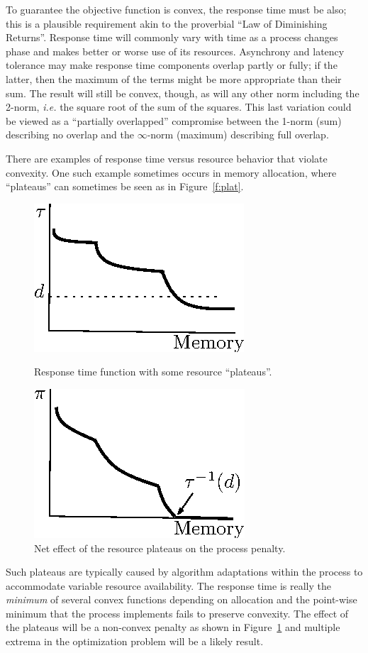 To guarantee the objective function is convex, the response time must be also;
this is a plausible requirement akin to the proverbial ``Law of Diminishing Returns''.
Response time will commonly vary with time as a process changes phase and makes better or worse use of its resources.
Asynchrony and latency tolerance may make response time components overlap partly or fully;
if the latter, then the maximum of the terms might be more appropriate than their sum.
The result will still be convex, though, as will any other norm including the 2-norm,
\emph{i.e.} the square root of the sum of the squares.
This last variation could be viewed as a ``partially overlapped'' compromise between
the 1-norm (sum) describing no overlap and the $\infty$-norm (maximum) describing full overlap.

There are examples of response time versus resource behavior that violate convexity.  One such example sometimes occurs in memory allocation, where ``plateaus'' can sometimes be seen as in Figure~\ref{f:plat}.
\begin{figure}[b]
\parbox{1.6in}{
\includegraphics*{Plateau1.eps}
\caption{\label{f:plat}Response time function with some resource ``plateaus''.}
}
\hspace{\fill}
\parbox{1.6in}{
\includegraphics*{Plateau2.eps}
\caption{\label{f:plateffect}Net effect of the resource plateaus on the process penalty.}
}
\end{figure}
Such plateaus are typically caused by algorithm adaptations within the process to accommodate variable resource availability.  The response time is really the \emph{minimum} of several convex functions depending on allocation and the point-wise minimum that the process implements fails to preserve convexity.  The effect of the plateaus will be a non-convex penalty as shown in Figure~\ref{f:plateffect} and multiple extrema in the optimization problem will be a likely result.

